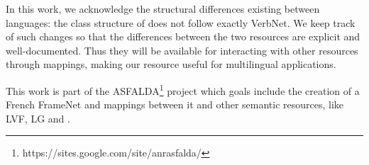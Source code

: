 In this work, we acknowledge the structural differences existing between
languages: the class structure of \verbenet{} does not follow exactly VerbNet.
We keep track of such changes so that the differences between the two resources
are explicit and well-documented. Thus they will be available for interacting
with other resources through mappings, making our resource useful for
multilingual applications.

This work is part of the
ASFALDA\footnote{https://sites.google.com/site/anrasfalda/} project which goals
include the creation of a French FrameNet and mappings between it and other
semantic resources, like LVF, LG and \verbenet{}.
